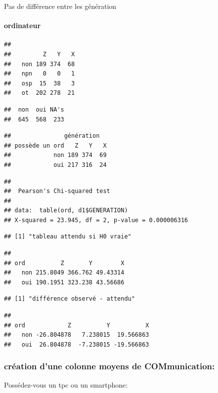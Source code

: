 \documentclass[]{article}
\begin{document}
Pas de différence entre les génération

\paragraph{ordinateur}\label{ordinateur}

\begin{verbatim}
##      
##         Z   Y   X
##   non 189 374  68
##   npn   0   0   1
##   osp  15  38   3
##   ot  202 278  21
\end{verbatim}

\begin{verbatim}
##  non  oui NA's 
##  645  568  233
\end{verbatim}

\begin{verbatim}
##               génération
## possède un ord   Z   Y   X
##            non 189 374  69
##            oui 217 316  24
\end{verbatim}

\begin{verbatim}
## 
##  Pearson's Chi-squared test
## 
## data:  table(ord, d1$GENERATION)
## X-squared = 23.945, df = 2, p-value = 0.000006316
\end{verbatim}

\begin{verbatim}
## [1] "tableau attendu si H0 vraie"
\end{verbatim}

\begin{verbatim}
##      
## ord          Z       Y        X
##   non 215.8049 366.762 49.43314
##   oui 190.1951 323.238 43.56686
\end{verbatim}

\begin{verbatim}
## [1] "différence observé - attendu"
\end{verbatim}

\begin{verbatim}
##      
## ord            Z          Y          X
##   non -26.804878   7.238015  19.566863
##   oui  26.804878  -7.238015 -19.566863
\end{verbatim}

\subsubsection{création d'une colonne moyens de
COMmunication:}\label{creation-dune-colonne-moyens-de-communication}

Possédez-vous un tpc ou un smartphone:
\end{document}
